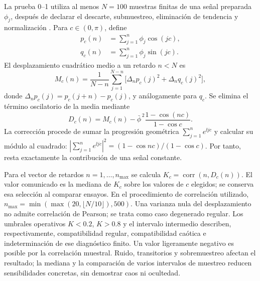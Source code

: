 La prueba 0--1 utiliza al menos $N=100$ muestras finitas de una señal
preparada $\phi_j$, después de
declarar el descarte, submuestreo, eliminación de tendencia y
normalización \cite{gottwald2009}. Para $c\in(0,\pi)$, define
\begin{align}
 p_c(n)&=\sum_{j=1}^n\phi_j\cos(jc),\nonumber\\
 q_c(n)&=\sum_{j=1}^n\phi_j\sin(jc).
 \label{diag:master:translations}
\end{align}
El desplazamiento cuadrático medio a un retardo $n<N$ es
\begin{equation}
 M_c(n)=\frac1{N-n}\sum_{j=1}^{N-n}
 \bigl[\Delta_np_c(j)^2+\Delta_nq_c(j)^2\bigr],
 \label{diag:master:msd}
\end{equation}
donde $\Delta_np_c(j)=p_c(j+n)-p_c(j)$, y análogamente para $q_c$.
Se elimina el término oscilatorio de la media mediante
\begin{equation}
 D_c(n)=M_c(n)-\bar\phi^{\,2}
                 \frac{1-\cos(nc)}{1-\cos c}.
 \label{diag:master:modified-msd}
\end{equation}
La corrección procede de sumar la progresión geométrica
$\sum_{j=1}^n e^{\ii jc}$ y calcular su módulo al cuadrado:
$|\sum_{j=1}^n e^{\ii jc}|^2=(1-\cos nc)/(1-\cos c)$.
Por tanto, resta exactamente la contribución de una señal constante.

Para el vector de retardos $n=1,\ldots,n_{\max}$ se calcula
$K_c=\operatorname{corr}(n,D_c(n))$. El valor comunicado es la mediana
de $K_c$ sobre los valores de $c$ elegidos; se conserva esa selección al
comparar ensayos. En el procedimiento de correlación utilizado,
$n_{\max}=\min(\max(20,\lfloor N/10\rfloor),500)$.
Una varianza nula del desplazamiento no admite correlación de Pearson;
se trata como caso degenerado regular. Los umbrales operativos
$K<0.2$, $K>0.8$ y el intervalo intermedio describen, respectivamente,
compatibilidad regular, compatibilidad caótica e indeterminación de ese
diagnóstico finito. Un valor ligeramente negativo es posible por la
correlación muestral. Ruido, transitorios y sobremuestreo afectan el
resultado; la mediana y la comparación de varios intervalos de muestreo
reducen sensibilidades concretas, sin demostrar caos ni ocultedad.
